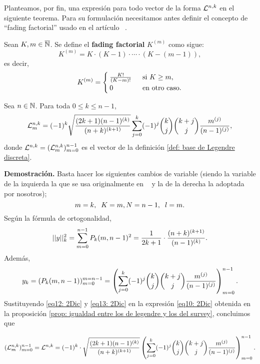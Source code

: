 Planteamos, por fin, una expresión para
todo vector de la forma
$\mathcal{L}^{n,k}$ en el siguiente teorema.
Para su formulación necesitamos antes
definir el concepto de ``fading factorial''
usado en el artículo ~\cite{Neuman}. 
\begin{defi}
\label{def: fading factorial}
Sean $K, m \in \overline{\mathbb{N}}$. Se define
el \textbf{fading factorial} $K^{(m)}$ como sigue:
\[
K^{(m)}= K \cdot (K-1) \cdot \cdots \cdot (K-(m-1)),
\]
es decir,\begin{align*}
K^{(m)}= \begin{cases}
\frac{K!}{(K-m)!} & \hspace{0.2cm} \text{si } K \geq m, \\
0 & \hspace{0.2cm} \text{en otro caso.} 
\end{cases}
\end{align*}
\end{defi}

\begin{teo}
\label{teo: expresión analítica de BON de Legendre}
Sea $n\in \mathbb{N}$. Para toda $0 \leq k \leq n-1$,
\begin{equation}
\label{eq0: 6En}
\mathcal{L}^{n,k}_{m}= (-1)^{k} \sqrt{\frac{(2k+1)(n-1)^{(k)}}{(n+k)^{(k+1)}}}
\sum\limits_{j=0}^{k}(-1)^{j}\binom{k}{j}\binom{k+j}{j}
\frac{m^{(j)}}{(n-1)^{(j)}},
\end{equation}
donde $\mathcal{L}^{n,k}=(\mathcal{L}_{m}^{n,k})_{m=0}^{n-1}$
es el vector de la definición
\ref{def: base de Legendre discreta}.
\end{teo}  

\noindent
\textbf{Demostración.}
Basta hacer los siguientes cambios de variable
(siendo la variable de la izquierda la que se
usa originalmente en ~\cite{Neuman} y la de la 
derecha la adoptada por nosotros);
\[
m=k, \hspace{0.2cm} K=m,
N=n-1, \hspace{0.2cm} l=m.
\]
Según la fórmula de ortogonalidad,
\begin{equation}
\label{eq12: 2Dic}
||y||_{k}^{2}= \sum\limits_{m=0}^{n-1}P_{k}(m, n-1)^{2}
= \frac{1}{2k+1} \cdot \frac{(n+k)^{(k+1)}}{(n-1)^{(k)}}.
\end{equation}
Además, 
\begin{equation}
\label{eq13: 2Dic}
y_{k}= (P_{k}(m, n-1))_{m=0}^{m=n-1}
= \left(
\sum\limits_{j=0}^{k}(-1)^{j}\binom{k}{j}\binom{k+j}{j}
\frac{m^{(j)}}{(n-1)^{(j)}}
\right)_{m=0}^{n-1}.
\end{equation}
Sustituyendo \eqref{eq12: 2Dic}
y \eqref{eq13: 2Dic} en la expresión
\eqref{eq10: 2Dic} obtenida
en la proposición
\ref{prop: igualdad entre los de legendre y los del survey},
concluimos que

\[
(\mathcal{L}_{m}^{n,k})_{m=0}^{n-1}
= \mathcal{L}^{n,k}
= (-1)^{k} \cdot 
\sqrt{\frac{(2k+1)(n-1)^{(k)}}{(n+k)^{(k+1)}}}
\left(
\sum\limits_{j=0}^{k}(-1)^{j}\binom{k}{j}\binom{k+j}{j}
\frac{m^{(j)}}{(n-1)^{(j)}}
\right)_{m=0}^{n-1}.
\]


\QEDB 
\vspace{0.2cm}